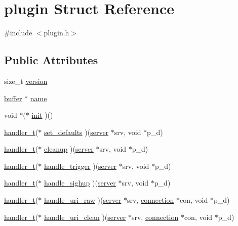 \hypertarget{structplugin}{\section{plugin Struct Reference}
\label{structplugin}
}


{\ttfamily \#include $<$plugin.\-h$>$}

\subsection*{Public Attributes}
\begin{DoxyCompactItemize}
\item 
size\-\_\-t \hyperlink{structplugin_aa4b3d495a0ae1df759643b712d91068f}{version}
\item 
\hyperlink{structbuffer}{buffer} $\ast$ \hyperlink{structplugin_a235162d1645d005e4d8ea2cedc80a236}{name}
\item 
void $\ast$($\ast$ \hyperlink{structplugin_a4cc5013e8cbed0a0d60337960674a1a4}{init} )()
\item 
\hyperlink{settings_8h_a2a8ffc3e29980db202f39ab85ab7e98e}{handler\-\_\-t}($\ast$ \hyperlink{structplugin_a04251883174cadf3e02ae1b1a388bdb7}{set\-\_\-defaults} )(\hyperlink{structserver}{server} $\ast$srv, void $\ast$p\-\_\-d)
\item 
\hyperlink{settings_8h_a2a8ffc3e29980db202f39ab85ab7e98e}{handler\-\_\-t}($\ast$ \hyperlink{structplugin_ac092882ffd286543515174a8bd3b70d2}{cleanup} )(\hyperlink{structserver}{server} $\ast$srv, void $\ast$p\-\_\-d)
\item 
\hyperlink{settings_8h_a2a8ffc3e29980db202f39ab85ab7e98e}{handler\-\_\-t}($\ast$ \hyperlink{structplugin_a6490af8e037a60d248395a8c68ee83f0}{handle\-\_\-trigger} )(\hyperlink{structserver}{server} $\ast$srv, void $\ast$p\-\_\-d)
\item 
\hyperlink{settings_8h_a2a8ffc3e29980db202f39ab85ab7e98e}{handler\-\_\-t}($\ast$ \hyperlink{structplugin_aaa3aaf5324316058a36ab97ab7303a62}{handle\-\_\-sighup} )(\hyperlink{structserver}{server} $\ast$srv, void $\ast$p\-\_\-d)
\item 
\hyperlink{settings_8h_a2a8ffc3e29980db202f39ab85ab7e98e}{handler\-\_\-t}($\ast$ \hyperlink{structplugin_ae798106278e8cd7e7241b1f1ee9ac914}{handle\-\_\-uri\-\_\-raw} )(\hyperlink{structserver}{server} $\ast$srv, \hyperlink{structconnection}{connection} $\ast$con, void $\ast$p\-\_\-d)
\item 
\hyperlink{settings_8h_a2a8ffc3e29980db202f39ab85ab7e98e}{handler\-\_\-t}($\ast$ \hyperlink{structplugin_afc26fff5d1ec7666608fda729b6a9a74}{handle\-\_\-uri\-\_\-clean} )(\hyperlink{structserver}{server} $\ast$srv, \hyperlink{structconnection}{connection} $\ast$con, void $\ast$p\-\_\-d)

\end{DoxyCompactItemize}
